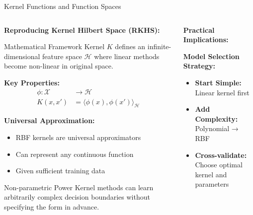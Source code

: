 \documentclass[8pt,aspectratio=1610]{beamer}
\begin{document}
\begin{frame}{Kernel Functions and Function Spaces}
\begin{columns}[t]
\begin{column}{0.48\textwidth}
\textbf{Reproducing Kernel Hilbert Space (RKHS):}
\vspace{0.3cm}

\begin{block}{Mathematical Framework}
Kernel $K$ defines an infinite-dimensional feature space $\mathcal{H}$ where linear methods become non-linear in original space.
\end{block}

\vspace{0.3cm}
\textbf{Key Properties:}
\begin{align}
\phi: \mathcal{X} &\to \mathcal{H} \\
K(x, x') &= \langle \phi(x), \phi(x') \rangle_{\mathcal{H}}
\end{align}

\vspace{0.3cm}
\textbf{Universal Approximation:}
\begin{itemize}
\setlength{\itemsep}{1pt}
\item RBF kernels are universal approximators
\item Can represent any continuous function
\item Given sufficient training data
\end{itemize}

\vspace{0.3cm}
\begin{alertblock}{Non-parametric Power}
Kernel methods can learn arbitrarily complex decision boundaries without specifying the form in advance.
\end{alertblock}
\end{column}

\begin{column}{0.48\textwidth}
\textbf{Practical Implications:}
\vspace{0.3cm}

\textbf{Model Selection Strategy:}
\begin{itemize}
\setlength{\itemsep}{1pt}
\item \textbf{Start Simple:} Linear kernel first
\item \textbf{Add Complexity:} Polynomial → RBF
\item \textbf{Cross-validate:} Choose optimal kernel and parameters
\end{itemize}


\end{column}
\end{columns}
\end{frame}
\end{document}
